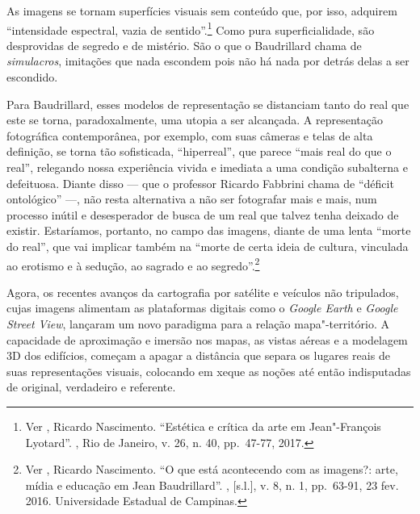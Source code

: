As imagens se tornam superfícies visuais sem conteúdo que, por isso,
adquirem ``intensidade espectral, vazia de sentido''.\footnote{Ver
  , Ricardo Nascimento. ``Estética e crítica da arte em
  Jean"-François Lyotard''. {}, Rio de Janeiro, v. 26, n. 40, pp.~47-77, 2017.}
Como pura superficialidade, são desprovidas de segredo e de mistério.
São o que o Baudrillard chama de \emph{simulacros}, imitações que nada \label{simulacros}
escondem pois não há nada por detrás delas a ser escondido.

Para Baudrillard, esses modelos de representação se distanciam tanto do
real que este se torna, paradoxalmente, uma utopia a ser alcançada. A
representação fotográfica contemporânea, por exemplo, com suas câmeras e
telas de alta definição, se torna tão sofisticada, ``hiperreal'', que
parece ``mais real do que o real'', relegando nossa experiência vivida e
imediata a uma condição subalterna e defeituosa. Diante disso --- que o
professor Ricardo Fabbrini chama de ``déficit ontológico'' ---, não resta
alternativa a não ser fotografar mais e mais, num processo inútil e
desesperador de busca de um real que talvez tenha deixado de existir.
Estaríamos, portanto, no campo das imagens, diante de uma lenta ``morte
do real'', que vai implicar também na ``morte de certa ideia de cultura,
vinculada ao erotismo e à sedução, ao sagrado e ao segredo''.\footnote{Ver
  , Ricardo Nascimento. ``O que está acontecendo com as
  imagens?: arte, mídia e educação em Jean
  Baudrillard''. {}, {[}s.l.{]}, v. 8, n. 1,
  pp.~63-91, 23 fev. 2016. Universidade Estadual de Campinas.}

Agora, os recentes avanços da cartografia por satélite e veículos não
tripulados, cujas imagens alimentam as plataformas digitais como o
\emph{Google Earth} e \emph{Google Street View}, lançaram um novo
paradigma para a relação mapa"-território. A capacidade de aproximação e
imersão nos mapas, as vistas aéreas e a modelagem 3D dos edifícios,
começam a apagar a distância que separa os lugares reais de suas
representações visuais, colocando em xeque as noções até então
indisputadas de original, verdadeiro e referente.

